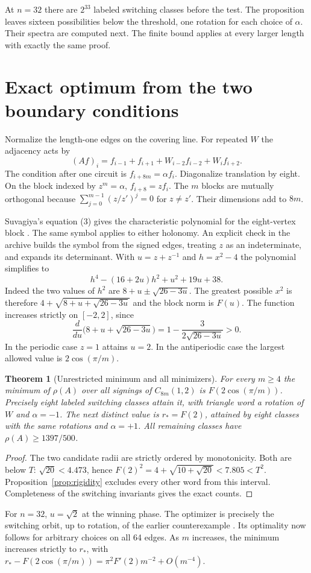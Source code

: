 \documentclass[11pt,letterpaper]{article}
\newtheorem{theorem}{Theorem}[section]\newtheorem{lemma}[theorem]{Lemma}
\begin{document}
At $n=32$ there are $2^{33}$ labeled switching classes before the test. The proposition leaves sixteen possibilities below the threshold, one rotation for each choice of $\alpha$. Their spectra are computed next. The finite bound applies at every larger length with exactly the same proof.

\newpage
\section{Exact optimum from the two boundary conditions}
Normalize the length-one edges on the covering line. For repeated $W$ the adjacency acts by
\[
 (Af)_i=f_{i-1}+f_{i+1}+W_{i-2} f_{i-2}+W_i f_{i+2}.
\]
The condition after one circuit is $f_{i+8m}=\alpha f_i$. Diagonalize translation by eight. On the block indexed by $z^m=\alpha$, $f_{i+8}=zf_i$. The $m$ blocks are mutually orthogonal because $\sum_{j=0}^{m-1}(z/ z')^j=0$ for $z\ne z'$. Their dimensions add to $8m$.

Suvagiya's equation (3) gives the characteristic polynomial for the eight-vertex block \cite{Suvagiya}. The same symbol applies to either holonomy. An explicit check in the archive builds the symbol from the signed edges, treating $z$ as an indeterminate, and expands its determinant. With $u=z+z^{-1}$ and $h=x^2-4$ the polynomial simplifies to
\[
          h^4-(16+2u)h^2+u^2+19u+38.
\]
Indeed the two values of $h^2$ are $8+u\pm\sqrt{26-3u}$. The greatest possible $x^2$ is therefore $4+\sqrt{8+u+\sqrt{26-3u}}$ and the block norm is $F(u)$. The function increases strictly on $[-2,2]$, since
\[
 \frac{d}{du}\big(8+u+\sqrt{26-3u}\big)
 =1-\frac{3}{2\sqrt{26-3u}}>0.
\]
In the periodic case $z=1$ attains $u=2$. In the antiperiodic case the largest allowed value is $2\cos(\pi/m)$.

\begin{theorem}[Unrestricted minimum and all minimizers]\label{thm:main}
For every $m\ge4$ the minimum of $\rho(A)$ over all signings of $C_{8m}(1,2)$ is $F(2\cos(\pi/m))$. Precisely eight labeled switching classes attain it, with triangle word a rotation of $W$ and $\alpha=-1$. The next distinct value is $r_*=F(2)$, attained by eight classes with the same rotations and $\alpha=+1$. All remaining classes have $\rho(A)\ge1397/500$.
\end{theorem}
\begin{proof}
The two candidate radii are strictly ordered by monotonicity. Both are below $T$: $\sqrt{20}<4.473$, hence $F(2)^2=4+\sqrt{10+\sqrt{20}}<7.805<T^2$. Proposition~\ref{prop:rigidity} excludes every other word from this interval. Completeness of the switching invariants gives the exact counts.
\end{proof}
For $n=32$, $u=\sqrt2$ at the winning phase. The optimizer is precisely the switching orbit, up to rotation, of the earlier counterexample \cite{Trure}. Its optimality now follows for arbitrary choices on all 64 edges. As $m$ increases, the minimum increases strictly to $r_*$, with
$ r_*-F(2\cos(\pi/m))=\pi^2 F'(2)m^{-2}+O(m^{-4})$.
\end{document}

